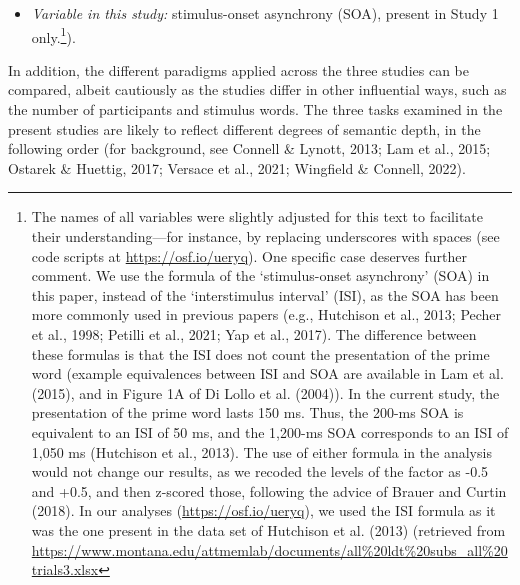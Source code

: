 \documentclass[
  12pt,
  man,floatsintext]{apa7}
\providecommand{\tightlist}{%
  \setlength{\itemsep}{0pt}\setlength{\parskip}{0pt}}
\begin{document}
\begin{itemize}
\tightlist
\item
  \emph{Variable in this study:} stimulus-onset asynchrony (SOA), present in Study 1 only.\footnote{The names of all variables were slightly adjusted for this text to facilitate their understanding---for instance, by replacing underscores with spaces (see code scripts at \url{https://osf.io/ueryq}). One specific case deserves further comment. We use the formula of the `stimulus-onset asynchrony' (SOA) in this paper, instead of the `interstimulus interval' (ISI), as the SOA has been more commonly used in previous papers (e.g., Hutchison et al., 2013; Pecher et al., 1998; Petilli et al., 2021; Yap et al., 2017). The difference between these formulas is that the ISI does not count the presentation of the prime word (example equivalences between ISI and SOA are available in Lam et al. (2015), and in Figure 1A of Di Lollo et al. (2004)). In the current study, the presentation of the prime word lasts 150 ms. Thus, the 200-ms SOA is equivalent to an ISI of 50 ms, and the 1,200-ms SOA corresponds to an ISI of 1,050 ms (Hutchison et al., 2013). The use of either formula in the analysis would not change our results, as we recoded the levels of the factor as -0.5 and +0.5, and then z-scored those, following the advice of Brauer and Curtin (2018). In our analyses (\url{https://osf.io/ueryq}), we used the ISI formula as it was the one present in the data set of Hutchison et al. (2013) (retrieved from \url{https://www.montana.edu/attmemlab/documents/all\%20ldt\%20subs_all\%20trials3.xlsx}}).
\end{itemize}

In addition, the different paradigms applied across the three studies can be compared, albeit cautiously as the studies differ in other influential ways, such as the number of participants and stimulus words. The three tasks examined in the present studies are likely to reflect different degrees of semantic depth, in the following order (for background, see Connell \& Lynott, 2013; Lam et al., 2015; Ostarek \& Huettig, 2017; Versace et al., 2021; Wingfield \& Connell, 2022).
\end{document}

